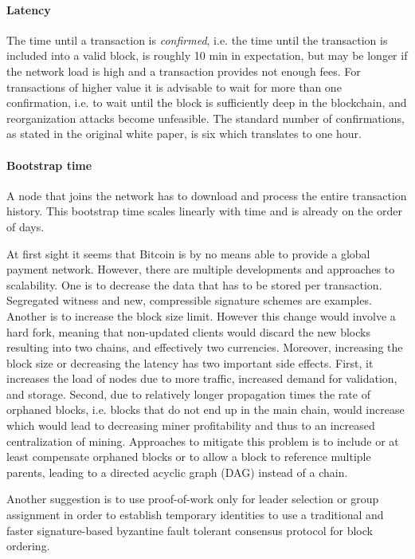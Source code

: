 \paragraph{Latency} The time until a transaction is \emph{confirmed}, i.e. the time until the transaction is included into a valid block, is roughly 10 min in expectation, but may be longer if the network load is high and a transaction provides not enough fees. For transactions of higher value it is advisable to wait for more than one confirmation, i.e. to wait until the block is sufficiently deep in the blockchain, and reorganization attacks become unfeasible. The standard number of confirmations, as stated in the original white paper, is six which translates to one hour. 
\paragraph{Bootstrap time} A node that joins the network has to download and process the entire transaction history. This bootstrap time scales linearly with time and is already on the order of days.

At first sight it seems that Bitcoin is by no means able to provide a global payment network. However, there are multiple developments and approaches to scalability. One is to decrease the data that has to be stored per transaction. Segregated witness \parencite{bip141} and new, compressible signature schemes are examples. Another is to increase the block size limit. However this change would involve a hard fork, meaning that non-updated clients would discard the new blocks resulting into two chains, and effectively two currencies. Moreover, increasing the block size or decreasing the latency has two important side effects. First, it increases the load of nodes due to more traffic, increased demand for validation, and storage. Second, due to relatively longer propagation times the rate of orphaned blocks, i.e. blocks that do not end up in the main chain, would increase which would lead to decreasing miner profitability and thus to an increased centralization of mining. Approaches to mitigate this problem is to include or at least compensate orphaned blocks \parencite{kiayias2016trees,Lewenberg2015,Sompolinsky2015} or to allow a block to reference multiple parents, leading to a directed acyclic graph (DAG) instead of a chain.

Another suggestion is to use proof-of-work only for leader selection \parencite{194906} or group assignment \parencite{DBLP:journals/corr/Kokoris-KogiasJ16} in order to establish temporary identities to use a traditional and faster signature-based byzantine fault tolerant consensus protocol for block ordering. 

